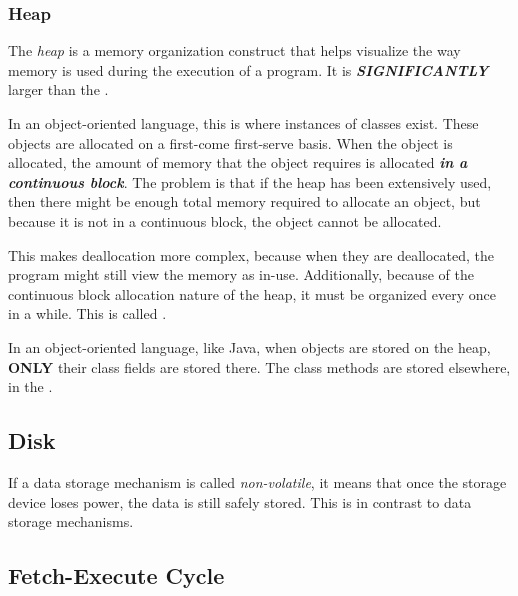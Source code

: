 \subsubsection{Heap}\label{subsubsec:Memory_Heap}
\begin{definition}[Heap]\label{def:Heap}
  The \emph{heap} is a memory organization construct that helps visualize the way memory is used during the execution of a program.
  It is \textbf{\emph{SIGNIFICANTLY}} larger than the .

  In an object-oriented language, this is where instances of classes exist.
  These objects are allocated on a first-come first-serve basis.
  When the object is allocated, the amount of memory that the object requires is allocated \textbf{\emph{in a continuous block}}.
  The problem is that if the heap has been extensively used, then there might be enough total memory required to allocate an object, but because it is not in a continuous block, the object cannot be allocated.
  
  This makes deallocation more complex, because when they are deallocated, the program might still view the memory as in-use.
  Additionally, because of the continuous block allocation nature of the heap, it must be organized every once in a while.
  This is called .

  \begin{remark}
    In an object-oriented language, like Java, when objects are stored on the heap, \textbf{ONLY} their class fields are stored there.
    The class methods are stored elsewhere, in the .
  \end{remark}
\end{definition}

\subsection{Disk}\label{subsec:Disk}
\begin{definition}\label{def:Non-Volatile}
  If a data storage mechanism is called \emph{non-volatile}, it means that once the storage device loses power, the data is still safely stored.
  This is in contrast to  data storage mechanisms.
\end{definition}

\subsection{Fetch-Execute Cycle}\label{subsec:Fetch_Execute_Cycle}
